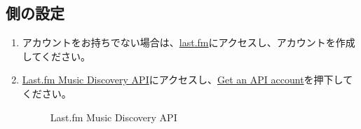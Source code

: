    \subsection{\lastfm 側の設定}
        \begin{enumerate}
            \item アカウントをお持ちでない場合は、\href{https://www.last.fm}{last.fm}にアクセスし、アカウントを作成してください。
            \item \href{https://www.last.fm/api}{Last.fm Music Discovery API}にアクセスし、\href{https://www.last.fm/api/account/create}{Get an API account}を押下してください。
                \begin{figure}[htbp]
                    \centering
                    \caption{Last.fm Music Discovery API}
                    \label{img:lastfm2}
                \end{figure}


\end{enumerate}
